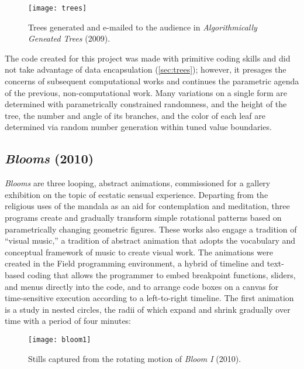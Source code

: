 \begin{figure}[H] 
\texttt{[image: trees]}
\caption{Trees generated and e-mailed to the audience in \emph{Algorithmically Geneated Trees} (2009). } 
\end{figure}

The code created for this project was made with primitive coding skills and did not take advantage of data encapsulation (\ref{sec:trees}); however, it presages the concerns of subsequent computational works and continues the parametric agenda of the previous, non-computational work. Many variations on a single form are determined with parametrically constrained randomness, and the height of the tree, the number and angle of its branches, and the color of each leaf are determined via random number generation within tuned value boundaries. 

\subsection{\emph{Blooms} (2010)}

\emph{Blooms} are three looping, abstract animations, commissioned for a gallery exhibition on the topic of ecstatic sensual experience. Departing from the religious uses of the mandala as an aid for contemplation and meditation, three programs create and gradually transform simple rotational patterns based on parametrically changing geometric figures. These works also engage a tradition of ``visual music,'' a tradition of abstract animation that adopts the vocabulary and conceptual framework of music to create visual work. The animations were created in the Field programming environment, a hybrid of timeline and text-based coding that allows the programmer to embed breakpoint functions, sliders, and menus directly into the code, and to arrange code boxes on a canvas for time-sensitive execution according to a left-to-right timeline. The first animation is a study in nested circles, the radii of which expand and shrink gradually over time with a period of four minutes:

\begin{figure}[H] 
\texttt{[image: bloom1]}
\caption{Stills captured from the rotating motion of \emph{Bloom I} (2010). } 
\end{figure}

